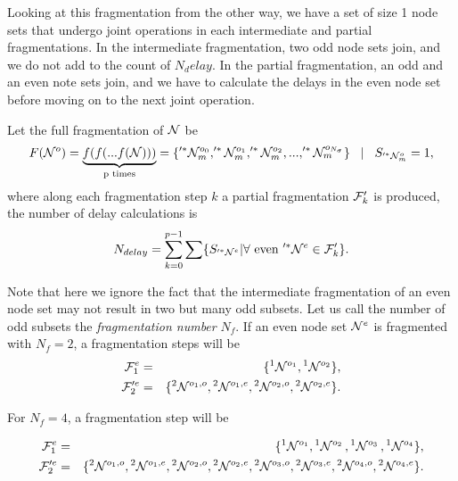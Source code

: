 Looking at this fragmentation from the other way, we have a set of size 1 node sets that undergo joint operations in each intermediate and partial fragmentations. In the intermediate fragmentation, two odd node sets join, and we do not add to the count of $N_delay$. In the partial fragmentation, an odd and an even note sets join, and we have to calculate the delays in the even node set before moving on to the next joint operation. 

\begin{lemma}
  Let the full fragmentation of $\mathcal{N}$ be
  \begin{equation}\label{eq:fullfrag}
    F(\mathcal{N}^o) = \underbrace{f(f(...f(\mathcal{N})))}_\text{p times} = \{'^*\mathcal{N}^{o_0}_m, '^*\mathcal{N}^{o_1}_m, '^*\mathcal{N}^{o_2}_m, ... ,'^*\mathcal{N}^{o_{N_\sigma}}_m \} \hspace{.3cm} | \hspace{.3cm} S_{'^*\mathcal{N}^{o}_m} = 1, 
  \end{equation}
  where along each fragmentation step $k$ a partial fragmentation $\mathcal{F}'_k$ is produced, the number of delay calculations is
  \begin{equation}\label{eq:maxdelay}
    N_{delay} = \sum_{k=0}^{p-1} \sum \{ S_{'^*\mathcal{N}^e} | \forall \mbox{ even } '^*\mathcal{N}^e \in \mathcal{F}'_k \}. 
  \end{equation}
\end{lemma}

Note that here we ignore the fact that the intermediate fragmentation of an even node set may not result in two but many odd subsets. Let us call the number of odd subsets the \emph{fragmentation number} $N_f$. If an even node set $\mathcal{N}^e$ is fragmented with $N_f=2$, a fragmentation steps will be
\begin{eqnarray*}
  \mathcal{F}^e_1 &=& \{ {}^{1} \mathcal{N}^{o_1}, {}^{1} \mathcal{N}^{o_2}\},  \\
  \mathcal{F}'^e_2 &=& \{{}^{2}\mathcal{N}^{o_1,o}, {}^{2}\mathcal{N}^{o_1,e}, {}^{2}\mathcal{N}^{o_2,o}, {}^{2}\mathcal{N}^{o_2,e} \}. 
\end{eqnarray*} 


For $N_f = 4$, a fragmentation step will be

\begin{eqnarray*}
  \mathcal{F}^e_1 &=& \{ {}^{1} \mathcal{N}^{o_1}, {}^{1} \mathcal{N}^{o_2}\, , {}^{1} \mathcal{N}^{o_3}\, , {}^{1} \mathcal{N}^{o_4}\},  \\
  \mathcal{F}'^e_2 &=& \{{}^{2}\mathcal{N}^{o_1,o}, {}^{2}\mathcal{N}^{o_1,e},  {}^{2}\mathcal{N}^{o_2,o}, {}^{2}\mathcal{N}^{o_2,e},  {}^{2}\mathcal{N}^{o_3,o}, {}^{2}\mathcal{N}^{o_3,e}, {}^{2}\mathcal{N}^{o_4,o}, {}^{2}\mathcal{N}^{o_4,e} \}. 
\end{eqnarray*}

